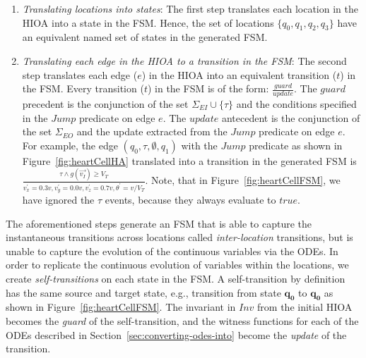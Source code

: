 \begin{enumerate}
\item \textit{Translating locations into states}: The first step
  translates each location in the \ac{HIOA} into a state in the
  \ac{FSM}. Hence, the set of locations $\{q_{0}, q_{1}, q_{2}, q_{3}\}$
  have an equivalent named set of states in the generated \ac{FSM}.
\item \textit{Translating each edge in the \ac{HIOA} to a transition in
    the \ac{FSM}}: The second step translates each edge ($e$) in the
  \ac{HIOA} into an equivalent transition ($t$) in the \ac{FSM}. Every
  transition ($t$) in the \ac{FSM} is of the form:
  $\frac{guard}{update}$. The $guard$ precedent is the conjunction of
  the set $\Sigma_{EI} \cup \{\tau\}$ and the conditions specified in
  the $Jump$ predicate on edge $e$. The $update$ antecedent is the
  conjunction of the set $\Sigma_{EO}$ and the update extracted from the $Jump$ 
  predicate on edge $e$. For example, the
  edge $(q_{0}, \tau, \emptyset, q_{1})$ with the $Jump$ predicate as
  shown in Figure~\ref{fig:heartCellHA} translated into a transition in
  the generated \ac{FSM} is
  $\frac{\tau \wedge g(\vec{v_{I}}) \geq V_{T}}{v^{\prime}_{x} = 0.3v,
    v^{\prime}_{y}=0.0v, v^{\prime}_{z}=0.7v, \theta^{\prime}=v/V_{T}}$. Note, 
  that in
  Figure~\ref{fig:heartCellFSM}, we have ignored the $\tau$ events,
  because they always evaluate to $true$.

\end{enumerate}


The aforementioned steps generate an \ac{FSM} that is able to capture
the instantaneous transitions across locations called
\textit{inter-location} transitions, but is unable to capture the
evolution of the continuous variables via the \acp{ODE}. In order to
replicate the continuous evolution of variables within the locations, we
create \textit{self-transitions} on each state in the \ac{FSM}. A
self-transition by definition has the same source and target state,
e.g., transition from state $\mathbf{q_{0}}$ to $\mathbf{q_{0}}$ as shown in
Figure~\ref{fig:heartCellFSM}. The invariant in $Inv$ from the initial
\ac{HIOA} becomes the \emph{guard} of the self-transition, and the witness
functions for each of the \acp{ODE} described in
Section~\ref{sec:converting-odes-into} become the \emph{update} of the
transition.

